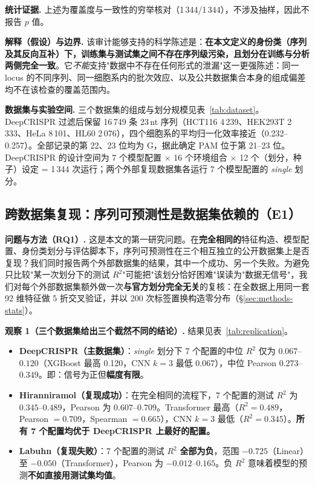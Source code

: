 \textbf{统计证据.} 上述为覆盖度与一致性的穷举核对（1\,344/1\,344），不涉及抽样，因此不报告 $p$ 值。

\textbf{解释（假设）与边界.} 该审计能够支持的科学陈述是：\textbf{在本文定义的身份类（序列及其反向互补）下，训练集与测试集之间不存在序列级污染，且划分在训练与分析两侧完全一致}。它\emph{不能}支持"数据中不存在任何形式的泄漏"这一更强陈述：同一 locus 的不同序列、同一细胞系内的批次效应、以及公共数据集合本身的组成偏差均不在该检查的覆盖范围内。

\textbf{数据集与实验空间.} 三个数据集的组成与划分规模见表~\ref{tab:dataset}。DeepCRISPR 过滤后保留 16\,749 条 23\,nt 序列（HCT116 4\,239、HEK293T 2\,333、HeLa 8\,101、HL60 2\,076），四个细胞系的平均归一化效率接近（0.232--0.257）。全部记录的第 22、23 位均为 G，据此确定 PAM 位于第 21--23 位。DeepCRISPR 的设计空间为 7 个模型配置 $\times$ 16 个环境组合 $\times$ 12 个（划分，种子）设定 = 1\,344 次运行；两个外部复现数据集各运行 7 个模型配置的 \emph{single} 划分。




\subsection{跨数据集复现：序列可预测性是数据集依赖的（E1）}
\label{sec:res-replication}

\textbf{问题与方法（RQ1）.} 这是本文的第一研究问题。在\textbf{完全相同的}特征构造、模型配置、身份类划分与评估脚本下，序列可预测性在三个相互独立的公开数据集上是否复现？我们同时报告两个外部数据集的结果，其中一个成功、另一个失败。为避免只比较"某一次划分下的测试 $R^{2}$"可能把"该划分恰好困难"误读为"数据无信号"，我们对每个外部数据集额外做一次\textbf{与官方划分完全无关}的复核：在全数据上用同一套 92 维特征做 5 折交叉验证，并以 200 次标签置换构造零分布（\S\ref{sec:methods-stats}）。

\textbf{观察 1（三个数据集给出三个截然不同的结论）.} 结果见表~\ref{tab:replication}。

\begin{itemize}
\item \textbf{DeepCRISPR（主数据集）}：\emph{single} 划分下 7 个配置的中位 $R^{2}$ 仅为 $0.067$--$0.120$（XGBoost 最高 0.120，CNN $k{=}3$ 最低 0.067），中位 Pearson $0.273$--$0.349$。即：信号为正但\textbf{幅度有限}。
\item \textbf{Hiranniramol（复现成功）}：在完全相同的流程下，7 个配置的测试 $R^{2}$ 为 $0.345$--$0.489$，Pearson 为 $0.607$--$0.709$。Transformer 最高（$R^{2}=0.489$，Pearson $=0.709$，Spearman $=0.665$），CNN $k{=}3$ 最低（$R^{2}=0.345$）。\textbf{所有 7 个配置均优于 DeepCRISPR 上最好的配置。}
\item \textbf{Labuhn（复现失败）}：7 个配置的测试 $R^{2}$ \textbf{全部为负}，范围 $-0.725$（Linear）至 $-0.050$（Transformer），Pearson 为 $-0.012$--$0.165$。负 $R^{2}$ 意味着模型的预测\textbf{不如直接用测试集均值}。
\end{itemize}

